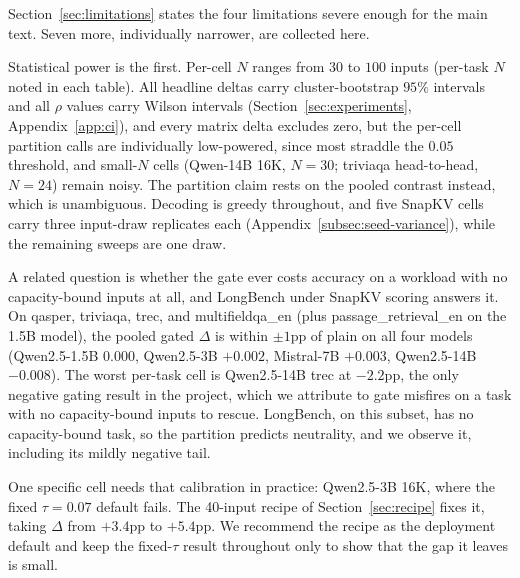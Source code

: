 Section~\ref{sec:limitations} states the four limitations severe enough
for the main text. Seven more, individually narrower, are collected here.

Statistical power is the first. Per-cell $N$ ranges from $30$ to $100$
inputs (per-task $N$ noted in each table). All headline deltas carry
cluster-bootstrap $95\%$ intervals and all $\rho$ values carry Wilson
intervals (Section~\ref{sec:experiments}, Appendix~\ref{app:ci}), and
every matrix delta excludes zero, but the per-cell partition calls are
individually low-powered, since most straddle the $0.05$ threshold, and
small-$N$ cells (Qwen-14B 16K, $N = 30$; triviaqa head-to-head, $N = 24$)
remain noisy. The partition claim rests on the pooled contrast instead,
which is unambiguous. Decoding is greedy throughout, and five SnapKV
cells carry three input-draw replicates each
(Appendix~\ref{subsec:seed-variance}), while the remaining sweeps are one
draw.

A related question is whether the gate ever costs accuracy on a workload
with no capacity-bound inputs at all, and LongBench under SnapKV scoring
answers it. On qasper, triviaqa, trec, and multifieldqa\_en
\citep{arxiv230814508} (plus passage\_retrieval\_en on the 1.5B model),
the pooled gated $\Delta$ is within $\pm 1$pp of plain on all four models
(Qwen2.5-1.5B $0.000$, Qwen2.5-3B $+0.002$, Mistral-7B $+0.003$,
Qwen2.5-14B $-0.008$). The worst per-task cell is Qwen2.5-14B trec at
$-2.2$pp, the only negative gating result in the project, which we
attribute to gate misfires on a task with no capacity-bound inputs to
rescue. LongBench, on this subset, has no capacity-bound task, so the
partition predicts neutrality, and we observe it, including its mildly
negative tail.

One specific cell needs that calibration in practice: Qwen2.5-3B 16K,
where the fixed $\tau = 0.07$ default fails. The 40-input recipe of
Section~\ref{sec:recipe} fixes it, taking $\Delta$ from $+3.4$pp to
$+5.4$pp. We recommend the recipe as the deployment default and keep the
fixed-$\tau$ result throughout only to show that the gap it leaves is
small.

